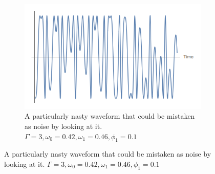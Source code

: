 \documentclass[onecolumn, groupedaddress, 10pt]{revtex4-1}
\begin{document}
\begin{figure}[H]
\begin{subfigure}{.5\textwidth}
	\end{subfigure}
	\begin{subfigure}{.5\textwidth}
  		\centering
  		\includegraphics[width=.9\linewidth]{nastySignal.png}
  		\caption{A particularly nasty waveform that could be mistaken as noise by looking at it. $\Gamma = 3, \omega_0 = 0.42, \omega_1 = 0.46, \phi_1 = 0.1$ \label{fig:nastySignal}}
	\end{subfigure}
\end{figure}


\end{document}
